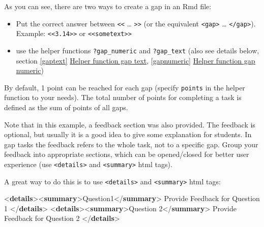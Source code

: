 \documentclass[twoside]{tufte-book}
\newenvironment{Shaded}{}{}
\newcommand{\DataTypeTok}[1]{\textcolor[rgb]{0.56,0.13,0.00}{#1}}
\newcommand{\KeywordTok}[1]{\textcolor[rgb]{0.00,0.44,0.13}{\textbf{#1}}}
\newcommand{\NormalTok}[1]{#1}
\providecommand{\tightlist}{%
  \setlength{\itemsep}{0pt}\setlength{\parskip}{0pt}}
\begin{document}
As you can see, there are two ways to create a gap in an Rmd file:

\begin{itemize}
\tightlist
\item
  Put the correct answer between \texttt{\textless{}\textless{}} \ldots{} \texttt{\textgreater{}\textgreater{}} (or the equivalent \texttt{\textless{}gap\textgreater{}} \ldots{} \texttt{\textless{}/gap\textgreater{}}). Example: \texttt{\textless{}\textless{}3.14\textgreater{}\textgreater{}} or \texttt{\textless{}\textless{}sometext\textgreater{}\textgreater{}}
\item
  use the helper functions \texttt{?gap\_numeric} and \texttt{?gap\_text} (also see details below, section \ref{gaptext} \hyperref[gaptext]{Helper function gap text}, \ref{gapnumeric} \hyperref[gapnumeric]{Helper function gap numeric})
\end{itemize}

By default, 1 point can be reached for each gap (specify \texttt{points} in the helper function to your needs). The total number of points for completing a task is defined as the sum of points of all gaps.

Note that in this example, a feedback section was also provided. The feedback is
optional, but usually it is a good idea to give some explanation for students. In gap tasks the feedback refers to the whole task, not to a specific gap. Group your feedback into appropriate sections, which can be opened/closed for better user experience (use \texttt{\textless{}details\textgreater{}} and \texttt{\textless{}summary\textgreater{}} html tags).

A great way to do this is to use \texttt{\textless{}details\textgreater{}} and \texttt{\textless{}summary\textgreater{}} html tags:

\begin{Shaded}
\begin{Highlighting}[]
\DataTypeTok{\textless{}}\KeywordTok{details}\DataTypeTok{\textgreater{}\textless{}}\KeywordTok{summary}\DataTypeTok{\textgreater{}}\NormalTok{Question1}\DataTypeTok{\textless{}/}\KeywordTok{summary}\DataTypeTok{\textgreater{}}
\NormalTok{  Provide Feedback for Question 1}
\DataTypeTok{\textless{}/}\KeywordTok{details}\DataTypeTok{\textgreater{}}
\DataTypeTok{\textless{}}\KeywordTok{details}\DataTypeTok{\textgreater{}\textless{}}\KeywordTok{summary}\DataTypeTok{\textgreater{}}\NormalTok{Question 2}\DataTypeTok{\textless{}/}\KeywordTok{summary}\DataTypeTok{\textgreater{}}
\NormalTok{  Provide Feedback for Question 2}
\DataTypeTok{\textless{}/}\KeywordTok{details}\DataTypeTok{\textgreater{}}
\end{Highlighting}
\end{Shaded}
\end{document}

